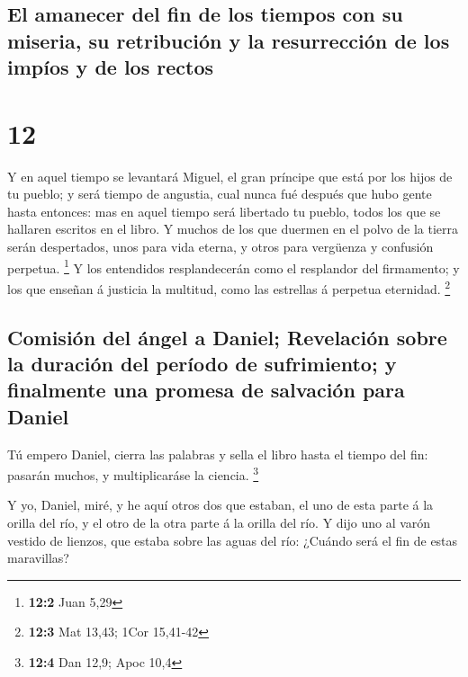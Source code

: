 \hypertarget{el-amanecer-del-fin-de-los-tiempos-con-su-miseria-su-retribuciuxf3n-y-la-resurrecciuxf3n-de-los-impuxedos-y-de-los-rectos}{%
\subsection{El amanecer del fin de los tiempos con su miseria, su
retribución y la resurrección de los impíos y de los
rectos}\label{el-amanecer-del-fin-de-los-tiempos-con-su-miseria-su-retribuciuxf3n-y-la-resurrecciuxf3n-de-los-impuxedos-y-de-los-rectos}}

\hypertarget{section-11}{%
\section{12}\label{section-11}}

 Y en aquel tiempo se levantará Miguel, el gran príncipe
que está por los hijos de tu pueblo; y será tiempo de angustia, cual
nunca fué después que hubo gente hasta entonces: mas en aquel tiempo
será libertado tu pueblo, todos los que se hallaren escritos en el
libro.  Y muchos de los que duermen en el polvo de la
tierra serán despertados, unos para vida eterna, y otros para vergüenza
y confusión perpetua. \footnote{\textbf{12:2} Juan 5,29} 
Y los entendidos resplandecerán como el resplandor del firmamento; y los
que enseñan á justicia la multitud, como las estrellas á perpetua
eternidad. \footnote{\textbf{12:3} Mat 13,43; 1Cor 15,41-42}

\hypertarget{comisiuxf3n-del-uxe1ngel-a-daniel-revelaciuxf3n-sobre-la-duraciuxf3n-del-peruxedodo-de-sufrimiento-y-finalmente-una-promesa-de-salvaciuxf3n-para-daniel}{%
\subsection{Comisión del ángel a Daniel; Revelación sobre la duración
del período de sufrimiento; y finalmente una promesa de salvación para
Daniel}\label{comisiuxf3n-del-uxe1ngel-a-daniel-revelaciuxf3n-sobre-la-duraciuxf3n-del-peruxedodo-de-sufrimiento-y-finalmente-una-promesa-de-salvaciuxf3n-para-daniel}}

 Tú empero Daniel, cierra las palabras y sella el libro
hasta el tiempo del fin: pasarán muchos, y multiplicaráse la ciencia.
\footnote{\textbf{12:4} Dan 12,9; Apoc 10,4}

 Y yo, Daniel, miré, y he aquí otros dos que estaban, el
uno de esta parte á la orilla del río, y el otro de la otra parte á la
orilla del río.  Y dijo uno al varón vestido de lienzos,
que estaba sobre las aguas del río: ¿Cuándo será el fin de estas
maravillas?

